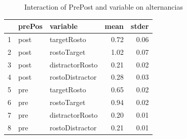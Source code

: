 \documentclass{article}
\begin{document}
\begin{figure}[H]
  \caption{Interaction of PrePost and variable on alternancias}
  \noindent{}
  \centering
\end{figure}

\begin{table}[ht]
\centering
\begin{tabular}{rllrr}
  \hline
 & prePos & variable & mean & stder \\ 
  \hline
1 & post & targetRosto & 0.72 & 0.06 \\ 
  2 & post & rostoTarget & 1.02 & 0.07 \\ 
  3 & post & distractorRosto & 0.21 & 0.02 \\ 
  4 & post & rostoDistractor & 0.28 & 0.03 \\ 
  5 & pre & targetRosto & 0.65 & 0.02 \\ 
  6 & pre & rostoTarget & 0.94 & 0.02 \\ 
  7 & pre & distractorRosto & 0.20 & 0.01 \\ 
  8 & pre & rostoDistractor & 0.21 & 0.01 \\ 
   \hline
\end{tabular}
\end{table}
\end{document}
